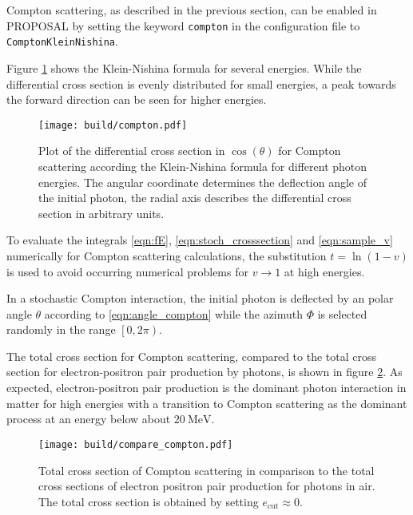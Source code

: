 \begin{sloppypar}
Compton scattering, as described in the previous section, can be enabled in PROPOSAL by setting the keyword \texttt{compton} in the configuration file to \texttt{ComptonKleinNishina}.
\end{sloppypar}
Figure \ref{fig:compton} shows the Klein-Nishina formula for several energies.
While the differential cross section is evenly distributed for small energies, a peak towards the forward direction can be seen for higher energies.

\begin{figure}
    \centering
    \texttt{[image: build/compton.pdf]}
    \caption{Plot of the differential cross section in $\cos(\theta)$ for Compton scattering according the Klein-Nishina formula for different photon energies. The angular coordinate determines the deflection angle of the initial photon, the radial axis describes the differential cross section in arbitrary units.}
    \label{fig:compton}
\end{figure}

To evaluate the integrals \eqref{eqn:fE}, \eqref{eqn:stoch_crosssection} and \eqref{eqn:sample_v} numerically for Compton scattering calculations, the substitution $t = \ln(1 - v)$ is used to avoid occurring numerical problems for $v \to 1$ at high energies.

In a stochastic Compton interaction, the initial photon is deflected by an polar angle $\theta$ according to \eqref{eqn:angle_compton} while the azimuth $\Phi$ is selected randomly in the range $\left[0,2\pi\right)$.

The total cross section for Compton scattering, compared to the total cross section for electron-positron pair production by photons, is shown in figure \ref{fig:compton_comparison}.
As expected, electron-positron pair production is the dominant photon interaction in matter for high energies with a transition to Compton scattering as the dominant process at an energy below about $\SI{20}{\mega\electronvolt}$.

\begin{figure}
    \centering
    \texttt{[image: build/compare\_compton.pdf]}
    \caption{Total cross section of Compton scattering in comparison to the total cross sections of electron positron pair production for photons in air. The total cross section is obtained by setting $e_\text{cut} \approx 0$.}
    \label{fig:compton_comparison}
\end{figure}

